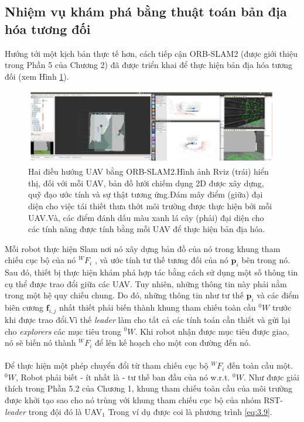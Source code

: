 \documentclass[11pt,openany]{book}
\begin{document}
\begin{algorimth}[H]
\subsection{Nhiệm vụ khám phá bằng thuật toán bản địa hóa tương đối}
Hướng tới một kịch bản thực tế hơn, cách tiếp cận ORB-SLAM2 (được giới thiệu trong Phần 5 của Chương 2) đã được triển khai để thực hiện bản địa hóa tương đối (xem Hình \ref{fig:3.23}).
\begin{figure}[H]
    \centering
    \includegraphics[tỉ lệ=0.3]{assets/3_23.png}
    \caption{Hai điều hướng UAV bằng ORB-SLAM2.Hình ảnh Rviz (trái) hiển thị, đối với mỗi UAV, bản đồ lưới chiếm dụng 2D được xây dựng, quỹ đạo ước tính và sự thật tương ứng.Đám mây điểm (giữa) đại diện cho việc tái thiết thưa thớt môi trường được thực hiện bởi mỗi UAV.Và, các điểm đánh dấu màu xanh lá cây (phải) đại diện cho các tính năng được tính bằng mỗi UAV để thực hiện bản địa hóa.}
    \label{fig:3.23}
\end{figure}
Mỗi robot thực hiện Slam nơi nó xây dựng bản đồ của nó trong khung tham chiếu cục bộ của nó $^WF_i$ , và ước tính tư thế tương đối của nó $\mathbf{p}_i$ bên trong nó. Sau đó, thiết bị thực hiện khám phá hợp tác bằng cách sử dụng một số thông tin cụ thể được trao đổi giữa các UAV. Tuy nhiên, những thông tin này phải nằm trong một hệ quy chiếu chung. Do đó, những thông tin như tư thế $\mathbf{p}_i$ và các điểm biên cương $\mathbf{f}_{i,j}$ nhất thiết phải biến thành khung tham chiếu toàn cầu $^0W$ trước khi được trao đổi.Vì thế \textit{leader} làm cho tất cả các tính toán cần thiết và gửi lại cho \textit{explorers} các mục tiêu trong $^0W$. Khi robot nhận được mục tiêu được giao, nó sẽ biến nó thành $^WF_i$ để lên kế hoạch cho một con đường đến nó.\\\\
Để thực hiện một phép chuyển đổi từ tham chiếu cục bộ $^WF_i$ đến toàn cầu một. $^0W$, Robot phải biết - ít nhất là - tư thế ban đầu của nó w.r.t. $^0W$. Như được giải thích trong Phần 5.2 của Chương 1, khung tham chiếu toàn cầu của môi trường được khởi tạo sao cho nó trùng với khung tham chiếu cục bộ của nhóm RST-\textit{leader} trong đội đó là UAV$_1$ Trong ví dụ được coi là phương trình \ref{eq:3.9}.

\end{algorimth}
\end{document}
